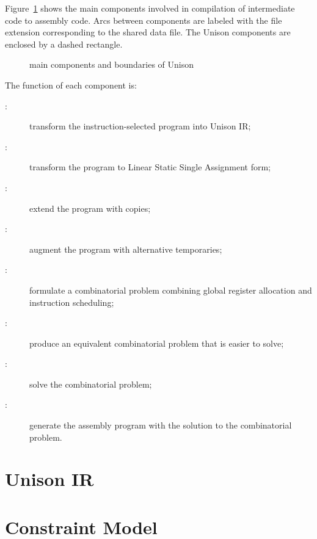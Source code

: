 \documentclass[11pt]{report}
\begin{document}
Figure~\ref{fig:components} shows the main components involved in compilation of
intermediate code to assembly code.
%
Arcs between components are labeled with the file extension corresponding to the
shared data file.
%
The Unison components are enclosed by a dashed rectangle.

\begin{figure}[H]
  \centering
  \scalebox{0.65}{}
  \caption{main components and boundaries of Unison}
  \label{fig:components}
\end{figure}

The function of each component is:

\begin{description}

\item [:] transform the instruction-selected program into
  Unison IR;

\item [:] transform the program to Linear Static Single
  Assignment form;

\item [:] extend the program with copies;

\item [:] augment the program with alternative temporaries;

\item [:] formulate a combinatorial problem combining global
  register allocation and instruction scheduling;

\item [:] produce an equivalent combinatorial problem
  that is easier to solve;

\item [:] solve the combinatorial problem;

\item [:] generate the assembly program with the solution to
  the combinatorial problem.

\end{description}

\chapter{Unison IR}
\label{sec:unison-ir}

\chapter{Constraint Model}\label{sec:constraint-model}
\end{document}
